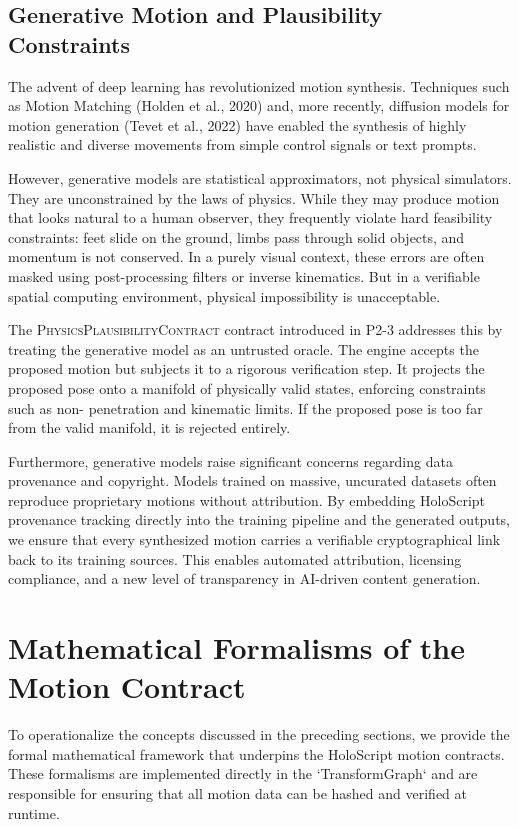\documentclass[sigconf,nonacm]{acmart}
\newcommand{\plausibility}{\textsc{PhysicsPlausibilityContract}}
\begin{document}
\subsection{Generative Motion and Plausibility Constraints} The advent of deep
learning has revolutionized motion synthesis. Techniques such as Motion Matching
(Holden et al., 2020) and, more recently, diffusion models for motion generation
(Tevet et al., 2022) have enabled the synthesis of highly realistic and diverse
movements from simple control signals or text prompts.

However, generative models are statistical approximators, not physical
simulators. They are unconstrained by the laws of physics. While they may
produce motion that looks natural to a human observer, they frequently violate
hard feasibility constraints: feet slide on the ground, limbs pass through solid
objects, and momentum is not conserved. In a purely visual context, these errors
are often masked using post-processing filters or inverse kinematics. But in a
verifiable spatial computing environment, physical impossibility is
unacceptable.

The \plausibility{} contract introduced in P2-3 addresses this by treating the
generative model as an untrusted oracle. The engine accepts the proposed motion
but subjects it to a rigorous verification step. It projects the proposed pose
onto a manifold of physically valid states, enforcing constraints such as non-
penetration and kinematic limits. If the proposed pose is too far from the valid
manifold, it is rejected entirely.

Furthermore, generative models raise significant concerns regarding data
provenance and copyright. Models trained on massive, uncurated datasets often
reproduce proprietary motions without attribution. By embedding HoloScript
provenance tracking directly into the training pipeline and the generated
outputs, we ensure that every synthesized motion carries a verifiable
cryptographical link back to its training sources. This enables automated
attribution, licensing compliance, and a new level of transparency in AI-driven
content generation.


\section{Mathematical Formalisms of the Motion Contract}

To operationalize the concepts discussed in the preceding sections, we provide
the formal mathematical framework that underpins the HoloScript motion
contracts. These formalisms are implemented directly in the `TransformGraph` and
are responsible for ensuring that all motion data can be hashed and verified at
runtime.
\end{document}
